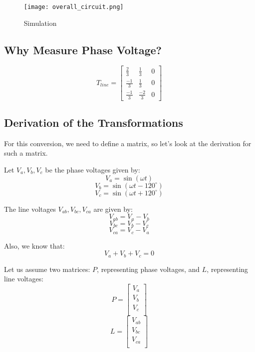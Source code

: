 \begin{figure}[ht]
    \centering
    \texttt{[image: overall\_circuit.png]}
    \caption{Simulation}
    \label{fig:Simulation1}
\end{figure}

\subsection{Why Measure Phase Voltage?}


\begin{equation*}
    T_{line} =
    \begin{bmatrix}
        \frac{2}{3}  & \frac{1}{3}  & 0 \\
        \frac{-1}{3} & \frac{1}{3}  & 0 \\
        \frac{-1}{3} & \frac{-2}{3} & 0
    \end{bmatrix}
\end{equation*}



\subsection{Derivation of the Transformations}
For this conversion, we need to define a matrix, so let's look at the
derivation for such a matrix.

Let \( V_a, V_b, V_c \) be the phase voltages given by:
\[
    V_a = \sin(\omega t)
\]
\[
    V_b = \sin(\omega t - 120^\circ)
\]
\[
    V_c = \sin(\omega t + 120^\circ)
\]

The line voltages \( V_{ab}, V_{bc}, V_{ca} \) are given by:
\[
    V_{ab} = V_a - V_b
\]
\[
    V_{bc} = V_b - V_c
\]
\[
    V_{ca} = V_c - V_a
\]

Also, we know that:
\[
    V_a + V_b + V_c = 0
\]

Let us assume two matrices: \( P \), representing phase voltages, and \( L \),
representing line voltages:
\[
    P = \begin{bmatrix}
        V_a \\
        V_b \\
        V_c \\
    \end{bmatrix}
\]
\[
    L = \begin{bmatrix}
        V_{ab} \\
        V_{bc} \\
        V_{ca} \\
    \end{bmatrix}
\]

